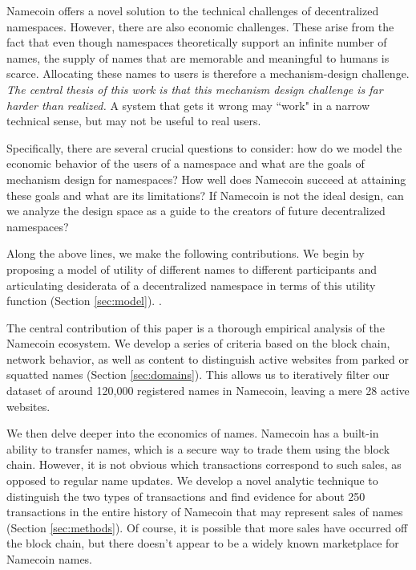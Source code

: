 Namecoin offers a novel solution to the technical challenges of decentralized namespaces. However, there are also economic challenges. These arise from the fact that even though namespaces theoretically support an infinite number of names, the supply of names that are memorable and meaningful to humans is scarce. Allocating these names to users is therefore a mechanism-design challenge. {\em The central thesis of this work is that this mechanism design challenge is far harder than realized.} A system that gets it wrong may ``work" in a narrow technical sense, but may not be useful to real users.

Specifically, there are several crucial questions to consider: how do we model the economic behavior of the users of a namespace and what are the goals of mechanism design for namespaces? How well does Namecoin succeed at attaining these goals and what are its limitations? If Namecoin is not the ideal design, can we analyze the design space as a guide to the creators of future decentralized namespaces?

Along the above lines, we make the following contributions. We begin by proposing a model of utility of different names to different participants and articulating desiderata of a decentralized namespace in terms of this utility function (Section \ref{sec:model}). \hi{[Elaborate]}.

The central contribution of this paper is a thorough empirical analysis of the Namecoin ecosystem. We develop a series of criteria based on the block chain, network behavior, as well as content to distinguish active websites from parked or squatted names (Section \ref{sec:domains}). This allows us to iteratively filter our dataset of around 120,000 registered names in Namecoin, leaving a mere 28 active websites.

We then delve deeper into the economics of names. Namecoin has a built-in ability to transfer names, which is a secure way to trade them using the block chain. However, it is not obvious which transactions correspond to such sales, as opposed to regular name updates. We develop a novel analytic technique to distinguish the two types of transactions and find evidence for about 250 transactions in the entire history of Namecoin that may represent sales of names (Section \ref{sec:methods}). Of course, it is possible that more sales have occurred off the block chain, but there doesn't appear to be a widely known marketplace for Namecoin names.

